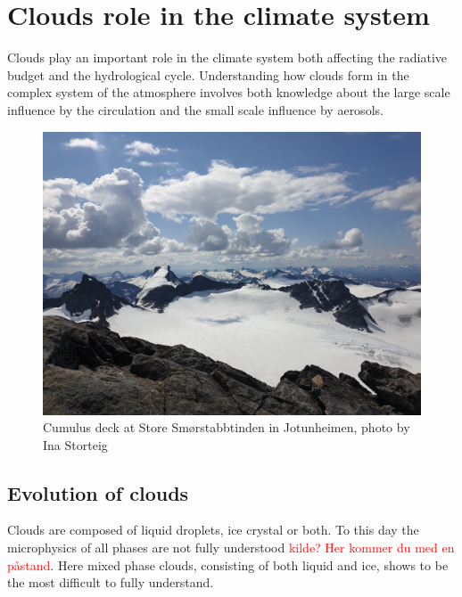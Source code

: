 \section{Clouds role in the climate system} \label{sec:cloud_in_climate_system}
Clouds play an important role in the climate system both affecting the radiative budget and the hydrological cycle. Understanding how clouds form in the complex system of the atmosphere involves both knowledge about the large scale influence by the circulation and the small scale influence by aerosols. 
\begin{figure}
    \centering
    \includegraphics[scale=0.1]{Chapter1_Intro/images/cloud_cover_ina.jpg}
    \caption{Cumulus deck at Store Smørstabbtinden in Jotunheimen, photo by Ina Storteig }
    \label{fig:cloudcover}
\end{figure}

\subsection{Evolution of clouds}
Clouds are composed of liquid droplets, ice crystal or both. To this day the microphysics of all phases are not fully understood \textcolor{red}{kilde? Her kommer du med en påstand}. Here mixed phase clouds, consisting of both liquid and ice, shows to be the most difficult to fully understand. 


